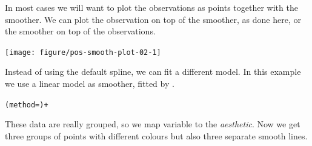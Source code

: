 \documentclass[krantz2]{krantz}\usepackage{knitr}%
\begin{document}
\begin{knitrout}\footnotesize
{}\color{fgcolor}\begin{kframe}
\begin{alltt}
\hlstd{(}  \hlstd{(}    \hlopt{+}
       \hlstd{()}
\end{alltt}
\end{kframe}
\end{knitrout}

In most cases we will want to plot the observations as points together with the smoother. We can plot the observation on top of the smoother, as done here, or the smoother on top of the observations.

\begin{knitrout}\footnotesize
{}\color{fgcolor}\begin{kframe}
\begin{alltt}
\hlstd{(}  \hlstd{(}    \hlopt{+}
  \hlstd{()} \hlopt{+}
  \hlstd{()}
\end{alltt}


{\ttfamily\noindent\itshape{}}\end{kframe}

{\centering \texttt{[image: figure/pos-smooth-plot-02-1]} 

}



\end{knitrout}

Instead of using the default spline, we can fit a different model. In this example we use a linear model as smoother, fitted by .

\begin{knitrout}\footnotesize
{}\color{fgcolor}\begin{kframe}
\begin{alltt}
  (method=) +
\end{alltt}
\end{kframe}
\end{knitrout}

These data are really grouped, so we map variable  to the  \emph{aesthetic}. Now we get three groups of points with different colours but also three separate smooth lines.
\end{document}
